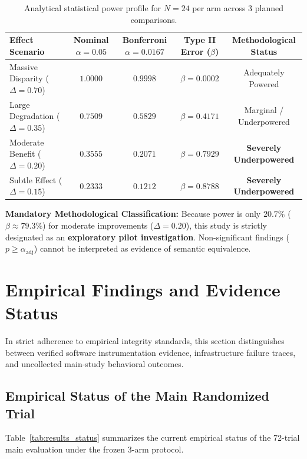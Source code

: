 \documentclass[11pt,a4paper]{article}
\begin{document}
\begin{table}[t]
\centering
\small
\caption{Analytical statistical power profile for $N=24$ per arm across 3 planned comparisons.}
\label{tab:power}
\begin{tabular}{lcccc}
\toprule
\textbf{Effect Scenario} & \textbf{Nominal $\alpha=0.05$} & \textbf{Bonferroni $\alpha=0.0167$} & \textbf{Type II Error ($\beta$)} & \textbf{Methodological Status} \\
\midrule
Massive Disparity ($\Delta = 0.70$) & $1.0000$ & $0.9998$ & $\beta = 0.0002$ & Adequately Powered \\
Large Degradation ($\Delta = 0.35$) & $0.7509$ & $0.5829$ & $\beta = 0.4171$ & Marginal / Underpowered \\
Moderate Benefit  ($\Delta = 0.20$) & $0.3555$ & $0.2071$ & $\beta = 0.7929$ & \textbf{Severely Underpowered} \\
Subtle Effect     ($\Delta = 0.15$) & $0.2333$ & $0.1212$ & $\beta = 0.8788$ & \textbf{Severely Underpowered} \\
\bottomrule
\end{tabular}
\end{table}

\textbf{Mandatory Methodological Classification:} Because power is only $20.7\%$ ($\beta \approx 79.3\%$) for moderate improvements ($\Delta = 0.20$), this study is strictly designated as an \textbf{exploratory pilot investigation}. Non-significant findings ($p \ge \alpha_{\text{adj}}$) cannot be interpreted as evidence of semantic equivalence.

\section{Empirical Findings and Evidence Status}
\label{sec:results}

In strict adherence to empirical integrity standards, this section distinguishes between verified software instrumentation evidence, infrastructure failure traces, and uncollected main-study behavioral outcomes.

\subsection{Empirical Status of the Main Randomized Trial}
Table~\ref{tab:results_status} summarizes the current empirical status of the 72-trial main evaluation under the frozen 3-arm protocol.
\end{document}
